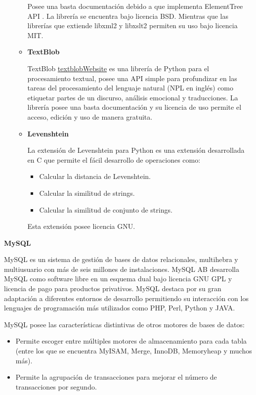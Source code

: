 \begin{itemize}
\begin{itemize}
			Posee una basta documentación debido a que implementa ElementTree API \cite{elementTree}. La librería se encuentra bajo licencia BSD. Mientras que las librerías que extiende libxml2 y libxslt2 permiten su uso bajo licencia MIT.
			
			\item \textbf{TextBlob}
			
			TextBlob \url{textblobWebsite} es una librería de Python para el procesamiento textual, posee una API simple para profundizar en las tareas  del procesamiento del lenguaje natural (NPL en inglés) como etiquetar partes de un discurso, análisis emocional y traducciones. La librería posee una basta documentación y su licencia de uso permite el acceso, edición y uso de manera gratuita.
			
			\item \textbf{Levenshtein}
			
			La extensión de Levenshtein \cite{pythonLeven} para Python es una extensión desarrollada en C que permite el fácil desarrollo de operaciones como: 
			\begin{itemize}
				\item Calcular la distancia de Levenshtein.
				\item Calcular la similitud de strings.
				\item Calcular la similitud de conjunto de strings.
			\end{itemize}
			
			Esta extensión posee licencia GNU.
		\end{itemize}
	\end{itemize}
		
		\item \textbf{MySQL}
		
		MySQL \cite{mysqlWeb} es un sistema de gestión de bases de datos relacionales, multihebra y multiusuario con más de seis millones de instalaciones. MySQL AB desarrolla MySQL como software libre en un esquema dual bajo licencia GNU GPL y licencia de pago para productos privativos. MySQL destaca por su gran adaptación a diferentes entornos de desarrollo permitiendo su interacción con los lenguajes de programación más utilizados como PHP, Perl, Python y JAVA. 
		
		MySQL posee las características distintivas de otros motores de bases de datos:
		\begin{itemize}
			\item Permite escoger entre múltiples motores de almacenamiento para cada tabla (entre los que se encuentra MyISAM, Merge, InnoDB, Memoryheap y muchos más).
			\item Permite la agrupación de  transacciones para mejorar el número de transacciones por segundo.
		\end{itemize}
		
